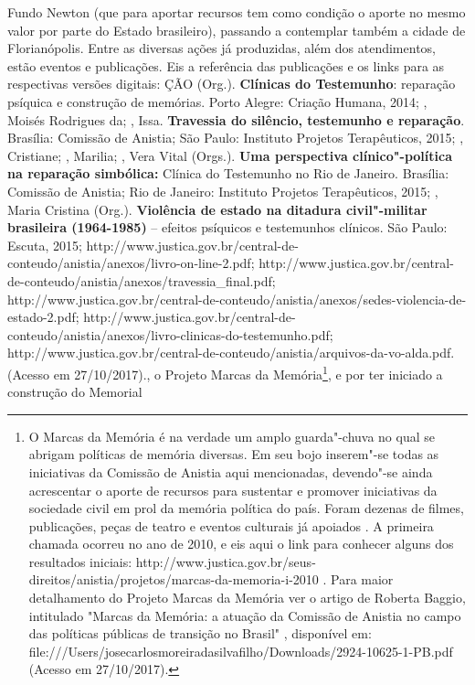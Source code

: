 {  Fundo Newton (que para aportar recursos tem como condição o aporte no
  mesmo valor por parte do Estado brasileiro), passando a contemplar
  também a cidade de Florianópolis. Entre as diversas ações já
  produzidas, além dos atendimentos, estão eventos e publicações. Eis a
  referência das publicações e os links para as respectivas versões
  digitais:   ÇÃO  (Org.).
  \textbf{Clínicas do Testemunho}: reparação psíquica e construção de
  memórias. Porto Alegre: Criação Humana, 2014;  , Moisés
  Rodrigues da; , Issa. \textbf{Travessia do silêncio,
  testemunho e reparação}. Brasília: Comissão de Anistia; São Paulo:
  Instituto Projetos Terapêuticos, 2015; , Cristiane; ,
  Marilia; , Vera Vital (Orgs.). \textbf{Uma perspectiva
  clínico"-política na reparação simbólica:} Clínica do Testemunho no Rio
  de Janeiro. Brasília: Comissão de Anistia; Rio de Janeiro: Instituto
  Projetos Terapêuticos, 2015; , Maria Cristina (Org.).
  \textbf{Violência de estado na ditadura civil"-militar brasileira
  (1964-1985)} -- efeitos psíquicos e testemunhos clínicos. São Paulo:
  Escuta, 2015;
  http://www.justica.gov.br/central-de-conteudo/anistia/anexos/livro-on-line-2.pdf;
  http://www.justica.gov.br/central-de-conteudo/anistia/anexos/travessia\_final.pdf;
  http://www.justica.gov.br/central-de-conteudo/anistia/anexos/sedes-violencia-de-estado-2.pdf;
  http://www.justica.gov.br/central-de-conteudo/anistia/anexos/livro-clinicas-do-testemunho.pdf;
  http://www.justica.gov.br/central-de-conteudo/anistia/arquivos-da-vo-alda.pdf.
  (Acesso em 27/10/2017).}, o Projeto Marcas da Memória\footnote{O
  Marcas da Memória é na verdade um amplo guarda"-chuva no qual se
  abrigam políticas de memória diversas. Em seu bojo inserem"-se todas as
  iniciativas da Comissão de Anistia aqui mencionadas, devendo"-se ainda
  acrescentar o aporte de recursos para sustentar e promover iniciativas
  da sociedade civil em prol da memória política do país. Foram dezenas
  de filmes, publicações, peças de teatro e eventos culturais já
  apoiados . A primeira chamada ocorreu no ano de 2010, e eis aqui o
  link para conhecer alguns dos resultados iniciais:
  http://www.justica.gov.br/seus-direitos/anistia/projetos/marcas-da-memoria-i-2010
  . Para maior detalhamento do Projeto Marcas da Memória ver o artigo de
  Roberta Baggio, intitulado "Marcas da Memória: a atuação da Comissão
  de Anistia no campo das políticas públicas de transição no Brasil" ,
  disponível em:
  file:///Users/josecarlosmoreiradasilvafilho/Downloads/2924-10625-1-PB.pdf
  (Acesso em 27/10/2017).}, e por ter iniciado a construção do Memorial
